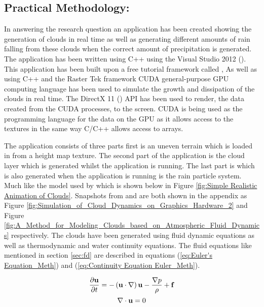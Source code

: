 \subsection{Practical Methodology:}
In answering the research question an application has been created showing the generation of clouds in real time as well as generating different amounts of rain falling from these clouds when the correct amount of precipitation is generated.
The application has been written using C++ using the Visual Studio 2012 (\citeyear{visualstudio2013}).
This application has been built upon a free tutorial framework called \cite{Rastertek14},
As well as using C++ and the Raster Tek framework \cite{nvidia2013} CUDA general-purpose GPU computing language has been used to simulate the growth and dissipation of the clouds in real time.
The DirectX 11 (\citeyear{DirectX12}) API has been used to render, the data created from the CUDA processes, to the screen.
CUDA is being used as the programming language for the data on the GPU as it allows access to the textures in the same way C/C++ allows access to arrays.

The application consists of three parts first is an uneven terrain which is loaded in from a height map texture. The second part of the application is the cloud layer which is generated whilst the application is running. The last part is which is also generated when the application is running is the rain particle system. 
Much like the model used by \citet{DobashiEtAl00} which is shown below in Figure \ref{fig:Simple Realistic Animation of Clouds}. Snapshots from \citet{HarrisEtAl03} and \citet{Miyazaki01} are both shown in the appendix as Figure \ref{fig:Simulation_of_Cloud_Dynamics_on_Graphics_Hardware_2} and Figure \ref{fig:A_Method_for_Modeling_Clouds_based_on_Atmospheric_Fluid_Dynamics} respectively.
The clouds have been generated using fluid dynamic equations as well as thermodynamic and water continuity equations. The fluid equations like mentioned in section \ref{sec:fd} are described in equations (\ref{eq:Euler's Equation_Meth}) and (\ref{eq:Continuity Equation Euler_Meth}). 

\begin{equation} \label{eq:Euler's Equation_Meth}
  \centering
   \frac{\partial \mathbf{u}}{\partial t}=-\left(\mathbf{u}\cdot \nabla \right)\mathbf{u}-\frac{\nabla p}{\rho}+\mathbf{f}
\end{equation}
\begin{equation} \label{eq:Continuity Equation Euler_Meth}
  \centering
  \nabla\cdot\mathbf{u}=0
\end{equation}

